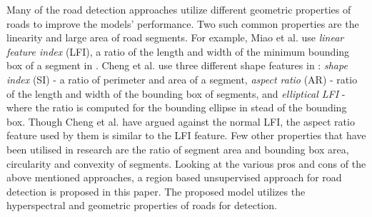 \documentclass[12pt,twoside]{article}
\theoremstyle{plain}
\theoremstyle{definition}
\theoremstyle{remark}
\newcommand{\forceindent}{\leavevmode{\parindent=2em\indent}}
\begin{document}
\forceindent Many of the road detection approaches utilize different geometric properties of roads to improve the models' performance. Two such common properties are the linearity and large area of road segments. For example, Miao et al. use \textit{linear feature index} (LFI), a ratio of the length and width of the minimum bounding box of a segment in \cite{Miao2013}. Cheng et al. use three different shape features in \cite{Cheng} : \textit{shape index} (SI) - a ratio of perimeter and area of a segment, \textit{aspect ratio} (AR) - ratio of the length and width of the bounding box of segments, and \textit{elliptical LFI} - where the ratio is computed for the bounding ellipse in stead of the bounding box. Though Cheng et al. have argued against the normal LFI, the aspect ratio feature used by them is similar to the LFI feature. Few other properties that have been utilised in research are the ratio of segment area and bounding box area, circularity and convexity of segments. Looking at the various pros and cons of the above mentioned approaches, a region based unsupervised approach for road detection is proposed in this paper. The proposed model utilizes the hyperspectral and geometric properties of roads for detection.
\end{document}
